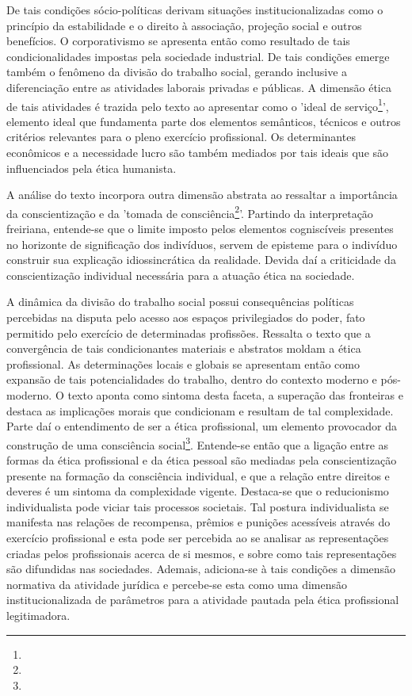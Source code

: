 \documentclass[
   article,       %
   12pt,          %
   oneside,       %
   a4paper,       %
   english,       %
   brazil,           %
   sumario=tradicional
   ]{abntex2}
\begin{document}
De tais condições sócio-políticas derivam situações institucionalizadas como o princípio da estabilidade e o direito à associação, projeção social e outros benefícios. O corporativismo se apresenta então como resultado de tais condicionalidades impostas pela sociedade industrial. De tais condições emerge também o fenômeno da divisão do trabalho social, gerando inclusive a diferenciação entre as atividades laborais privadas e públicas. A dimensão ética de tais atividades é trazida pelo texto ao apresentar como o 'ideal de serviço\footnote{}', elemento ideal que fundamenta parte dos elementos semânticos, técnicos e outros critérios relevantes para o pleno exercício profissional. Os determinantes econômicos e a necessidade lucro são também mediados por tais ideais que são influenciados pela ética humanista.

A análise do texto incorpora outra dimensão abstrata ao ressaltar a importância da conscientização e da 'tomada de consciência\footnote{}'. Partindo da interpretação freiriana, entende-se que o limite imposto pelos elementos cogniscíveis presentes no horizonte de significação dos indivíduos, servem de episteme para o indivíduo construir sua explicação idiossincrática da realidade. Devida daí a criticidade da conscientização individual necessária para a atuação ética na sociedade.

A dinâmica da divisão do trabalho social possui consequências políticas percebidas na disputa pelo acesso aos espaços privilegiados do poder, fato permitido pelo exercício de determinadas profissões. Ressalta o texto que a convergência de tais condicionantes materiais e abstratos moldam a ética profissional. As determinações locais e globais se apresentam então como expansão de tais potencialidades do trabalho, dentro do contexto moderno e pós-moderno. O texto aponta como sintoma desta faceta, a superação das fronteiras e destaca as implicações morais que condicionam e resultam de tal complexidade. Parte daí o entendimento de ser a ética profissional, um elemento provocador da construção de uma consciência social\footnote{}. Entende-se então que a ligação entre as formas da ética profissional e da ética pessoal são mediadas pela conscientização presente na formação da consciência individual, e que a relação entre direitos e deveres é um sintoma da complexidade vigente. Destaca-se que o reducionismo individualista pode viciar tais processos societais. Tal postura individualista se manifesta nas relações de recompensa, prêmios e punições acessíveis através do exercício profissional e esta pode ser percebida ao se analisar as representações criadas pelos profissionais acerca de si mesmos, e sobre como tais representações são difundidas nas sociedades. Ademais, adiciona-se à tais condições a dimensão normativa da atividade jurídica e percebe-se esta como uma dimensão institucionalizada de parâmetros para a atividade pautada pela ética profissional legitimadora.
\end{document}
